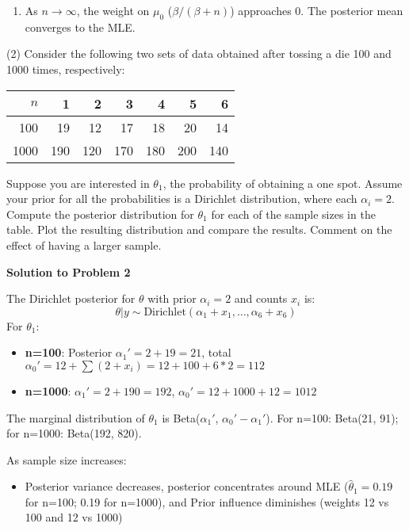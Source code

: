 \documentclass[final,11pt]{article}
\begin{document}
\begin{spacing}{1.25}
\begin{enumerate}
    \item As $n \to \infty$, the weight on $\mu_0$ ($\beta/(\beta + n)$) approaches 0. The posterior mean converges to the MLE.
\end{enumerate}

\newpage

(2) Consider the following two sets of data obtained after tossing a die 100 and 1000 times, respectively:
\begin{center}
    \begin{tabular}{ r r r r r r r }
        \hline
        $n$ & 1 & 2 & 3 & 4 & 5 & 6 \\
        \hline
        100 & 19 & 12 & 17 & 18 & 20 & 14 \\  
        1000 & 190 & 120 & 170 & 180 & 200 & 140 \\
        \hline
    \end{tabular}
\end{center}
Suppose you are interested in $\theta_1$, the probability of obtaining a one spot. Assume your prior for all the probabilities is a Dirichlet distribution, where each $\alpha_i=2$. Compute the posterior distribution for $\theta_1$ for each of the sample sizes in the table. Plot the resulting distribution and compare the results. Comment on the effect of having a larger sample.

\textbf{Solution to Problem 2}

The Dirichlet posterior for $\theta$ with prior $\alpha_i = 2$ and counts $x_i$ is:
\[
    \theta | y \sim \text{Dirichlet}(\alpha_1 + x_1, \ldots, \alpha_6 + x_6)
\]
For $\theta_1$:
\begin{itemize}
    \item \textbf{n=100}: Posterior $\alpha_1' = 2 + 19 = 21$, total $\alpha_0' = 12 + \sum (2 + x_i) = 12 + 100 + 6*2 = 112$
    \item \textbf{n=1000}: $\alpha_1' = 2 + 190 = 192$, $\alpha_0' = 12 + 1000 + 12 = 1012$
\end{itemize}

The marginal distribution of $\theta_1$ is Beta($\alpha_1'$, $\alpha_0' - \alpha_1'$). For n=100: Beta(21, 91); for n=1000: Beta(192, 820). 

As sample size increases:
\begin{itemize}
    \item Posterior variance decreases, posterior concentrates around MLE ($\hat{\theta}_1 = 0.19$ for n=100; 0.19 for n=1000), and Prior influence diminishes (weights 12 vs 100 and 12 vs 1000)
\end{itemize}
\end{spacing}
\end{document}
